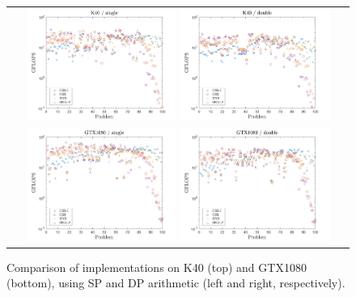 \begin{figure}[t]
\begin{tabular}{c}
\includegraphics[width=0.45\textwidth]{plots/performance_K40_single.pdf}
\includegraphics[width=0.45\textwidth]{plots/performance_K40_double.pdf}\\
\includegraphics[width=0.45\textwidth]{plots/performance_GTX1080_single.pdf}
\includegraphics[width=0.45\textwidth]{plots/performance_GTX1080_double.pdf}
\end{tabular}
\caption[Comparison of \spmv implementations]
    {Comparison of \spmv implementations on K40 (top)
    and GTX1080 (bottom), using SP and DP arithmetic (left and right, respectively).}
\label{2017-csr-spmv:fig:performance}
\end{figure}

